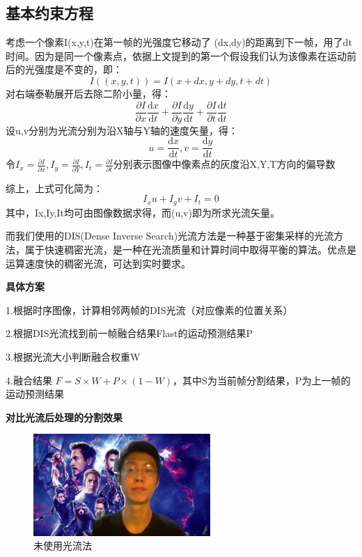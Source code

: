 \documentclass[11pt]{article}
\begin{document}
\subsection{基本约束方程}

考虑一个像素I(x,y,t)在第一帧的光强度它移动了 (dx,dy)的距离到下一帧，用了dt时间。因为是同一个像素点，依据上文提到的第一个假设我们认为该像素在运动前后的光强度是不变的，即：
\[
I\left((x,y,t)\right) = I\left(x + dx,y+dy,t+dt\right)    
\]
对右端泰勒展开后去除二阶小量，得：
\[
\frac{\partial I}{\partial x} \frac{\mathrm{d} x}{\mathrm{d} t} +\frac{\partial I}{\partial y} \frac{\mathrm{d} y}{\mathrm{d} t}+\frac{\partial I}{\partial t} \frac{\mathrm{d} t}{\mathrm{d} t}
\]
设u,v分别为光流分别为沿X轴与Y轴的速度矢量，得：
\[
u = \frac{\mathrm{d} x}{\mathrm{d} t} ,v =\frac{\mathrm{d} y}{\mathrm{d} t}   
\]
令$I_x = \frac{\partial I}{\partial x} ,I_y =\frac{\partial I}{\partial Y} ,I_t=\frac{\partial I}{\partial t} $分别表示图像中像素点的灰度沿X,Y,T方向的偏导数

综上，上式可化简为：
\[
I_x u +I_y v+I_t = 0    
\]
其中，Ix,Iy,It均可由图像数据求得，而(u,v)即为所求光流矢量。

而我们使用的DIS(Dense Inverse Search)光流方法是一种基于密集采样的光流方法，属于快速稠密光流，是一种在光流质量和计算时间中取得平衡的算法。优点是运算速度快的稠密光流，可达到实时要求。

\textbf{具体方案}

1.根据时序图像，计算相邻两帧的DIS光流（对应像素的位置关系）

2.根据DIS光流找到前一帧融合结果Flast的运动预测结果P

3.根据光流大小判断融合权重W

4.融合结果 $F = S\times W + P\times \left(1-W\right)$，其中S为当前帧分割结果，P为上一帧的运动预测结果

\textbf{对比光流后处理的分割效果}

\begin{figure}[H]
    \centering
    \includegraphics[width = 0.6\textwidth]{output_shuai.jpg}
    \caption{未使用光流法}
    \label{fig:image7}

\end{figure}
\end{document}
